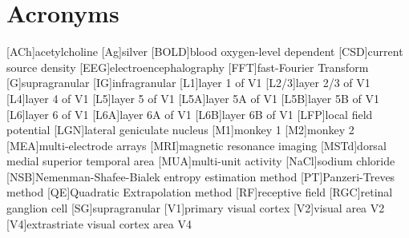    \chapter*{Acronyms}
    \begin{acronym}[BOLD]
        [ACh]{acetylcholine}
        [Ag]{silver}
        [BOLD]{blood oxygen-level dependent}
        [CSD]{current source density}
        [EEG]{electroencephalography}
        [FFT]{fast-Fourier Transform}
        [G]{supragranular}
        [IG]{infragranular}
        [L1]{layer 1 of \ac{V1}}
        [L2/3]{layer 2/3 of \ac{V1}}
        [L4]{layer 4 of \ac{V1}}
        [L5]{layer 5 of \ac{V1}}
        [L5A]{layer 5A of \ac{V1}}
        [L5B]{layer 5B of \ac{V1}}
        [L6]{layer 6 of \ac{V1}}
        [L6A]{layer 6A of \ac{V1}}
        [L6B]{layer 6B of \ac{V1}}
        [LFP]{local field potential}
        [LGN]{lateral geniculate nucleus}
        [M1]{monkey 1}
        [M2]{monkey 2}
        [MEA]{multi-electrode arrays}
        [MRI]{magnetic resonance imaging}
        [MSTd]{dorsal medial superior temporal area}
        [MUA]{multi-unit activity}
        [NaCl]{sodium chloride}
        [NSB]{{N}emenman-{S}hafee-{B}ialek entropy estimation method}
        [PT]{{P}anzeri-{T}reves method}
        [QE]{Quadratic Extrapolation method}
        [RF]{receptive field}
        [RGC]{retinal ganglion cell}
        [SG]{supragranular}
        [V1]{primary visual cortex}
        [V2]{visual area {V2}}
        [V4]{extrastriate visual cortex area {V4}}
    \end{acronym}                     
\endgroup
